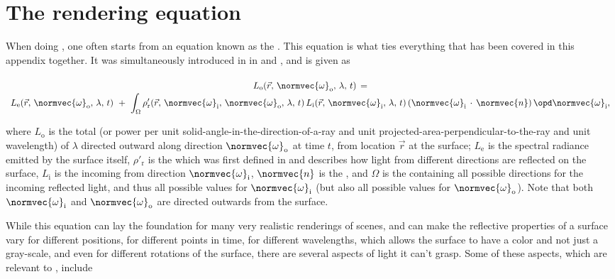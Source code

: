{\section{The rendering equation}

When doing , one often starts from an equation known as the . This equation is what ties everything that has been covered in this appendix together. It was simultaneously introduced in  in \citep{temp} and \citep{temp}, and is given as

\begin{equation} \label{eq:rendering_equation_original}
\renewcommand*{\arraystretch}{1.5}
\begin{array}{c}
L_{\text{o}}(\vec{r},\,\normvec{\omega}_{\text{o}},\, \lambda,\, t) \,= \\
\displaystyle L_{\text{e}}(\vec{r},\, \normvec{\omega}_{\text{o}},\, \lambda,\, t) \ + \ \int_\Omega \rho'_{\text{r}}(\vec{r},\, \normvec{\omega}_{\text{i}},\, \normvec{\omega}_{\text{o}},\, \lambda,\, t)\, L_{\text{i}}(\vec{r},\, \normvec{\omega}_{\text{i}},\, \lambda,\, t)\, (\normvec{\omega}_{\text{i}}\,\cdot\,\normvec{n})\, \opd \normvec{\omega}_{\text{i}},
\end{array}
\end{equation}

where $L_{\text{o}}$ is the total  (or power per unit solid-angle-in-the-direction-of-a-ray and unit projected-area-perpendicular-to-the-ray and unit wavelength) of  $\lambda$ directed outward along direction $\normvec{\omega}_{\text{o}}$ at time $t$, from location $\vec{r}$ at the surface; $L_{\text{e}}$ is the spectral radiance emitted by the surface itself, $\rho'_{\text{r}}$ is the \BRDF which was first defined in \citep{temp} and describes how light from different directions are reflected on the surface, $L_{\text{i}}$ is the  incoming from direction $\normvec{\omega}_{\text{i}}$, $\normvec{n}$ is the , and $\Omega$ is the  containing all possible directions for the incoming reflected light, and thus all possible values for $\normvec{\omega}_{\text{i}}$ (but also all possible values for $\normvec{\omega}_{\text{o}}$). Note that both $\normvec{\omega}_{\text{i}}$ and $\normvec{\omega}_{\text{o}}$ are directed outwards from the surface.

While this equation can lay the foundation for many very realistic renderings of \threedimensional scenes, and can make the reflective properties of a surface vary for different positions, for different points in time, for different wavelengths, which allows the surface to have a color and not just a gray-scale, and even for different rotations of the surface, there are several aspects of light it can't grasp. Some of these aspects, which are relevant to \surfacewaterrendering, include

}
